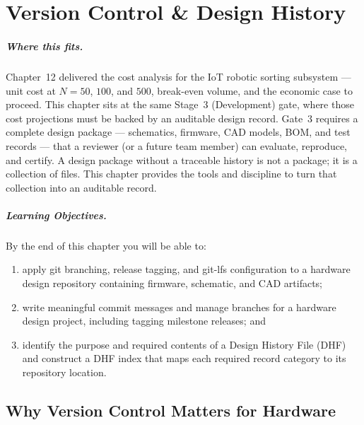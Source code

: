 
\chapter{Version Control \& Design History}
\label{ch:version-control}

\paragraph{Where this fits.}
Chapter~12 delivered the cost analysis for the IoT robotic sorting subsystem --- unit cost at $N=50$, $100$, and $500$, break-even volume, and the economic case to proceed.
This chapter sits at the same Stage~3 (Development) gate, where those cost projections must be backed by an auditable design record.
Gate~3 requires a complete design package --- schematics, firmware, CAD models, BOM, and
test records --- that a reviewer (or a future team member) can evaluate, reproduce, and
certify.
A design package without a traceable history is not a package; it is a collection of files.
This chapter provides the tools and discipline to turn that collection into an auditable
record.

\paragraph{Learning Objectives.}
By the end of this chapter you will be able to:
\begin{enumerate}
  \item apply git branching, release tagging, and git-lfs configuration to a hardware design repository containing firmware, schematic, and CAD artifacts;
  \item write meaningful commit messages and manage branches for a hardware design project,
        including tagging milestone releases; and
  \item identify the purpose and required contents of a Design History File (DHF) and construct a DHF index that maps each required record category to its repository location.
\end{enumerate}

\section{Why Version Control Matters for Hardware}
\label{sec:ch13-why}

